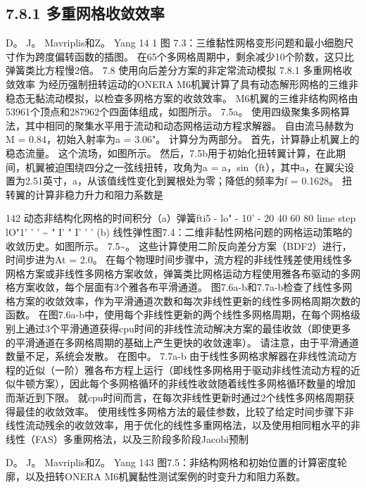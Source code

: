 \documentclass[UTF8,11pt,a4paper,openany,fontset=fandol]{ctexbook}
\begin{document}
\subsection{7.8.1 多重网格收敛效率}
D。 J。 Mavriplis和Z。 Yang 14 1 图 7.3：三维黏性网格变形问题和最小细胞尺寸作为跨度偏转函数的插图。 在65个多网格周期中，剩余减少10个阶数，这只比弹簧类比方程慢2倍。 7.8 使用向后差分方案的非定常流动模拟 7.8.1 多重网格收敛效率 为经历强制扭转运动的ONERA M6机翼计算了具有动态解形网格的三维非稳态无黏流动模拟，以检查多网格方案的收敛效率。 M6机翼的三维非结构网格由53961个顶点和287962个四面体组成，如图所示。 7.5a。 使用四级聚集多网格算法，其中相同的聚集水平用于流动和动态网格运动方程求解器。 自由流马赫数为M = 0.84，初始入射率为a = 3.06"。 计算分为两部分。 首先，计算静止机翼上的稳态流量。 这个流场，如图所示。 然后，7.5b用于初始化扭转翼计算，在此期间，机翼被迫围绕四分之一弦线扭转，攻角为a = a，sin（ft），其中a，在翼尖设置为2.51英寸，a，从该值线性变化到翼根处为零；降低的频率为f = 0.1628。 扭转翼的计算非稳力升力和阻力系数是

142 动态非结构化网格的时间积分（a）弹簧fti5 - lo" - 10' - 20 40 60 80 lime step lO"1' ' ' \textasciitilde{} " I' " I' ' ' (b) 线性弹性图7.4：二维非黏性网格问题的网格运动策略的收敛历史。如图所示。 7.5\textasciitilde{}。 这些计算使用二阶反向差分方案（BDF2）进行，时间步进为At = 2.0。 在每个物理时间步骤中，流方程的非线性残差使用线性多网格方案或非线性多网格方案收敛，弹簧类比网格运动方程使用雅各布驱动的多网格方案收敛，每个层面有3个雅各布平滑通道。 图7.6a-b和7.7a-b检查了线性多网格方案的收敛效率，作为平滑通道次数和每次非线性更新的线性多网格周期次数的函数。 在图7.6a-b中，使用每个非线性更新的两个线性多网格周期，在每个网格级别上通过3个平滑通道获得cpu时间的非线性流动解决方案的最佳收敛（即使更多的平滑通道在多网格周期的基础上产生更快的收敛速率）。 请注意，由于平滑通道数量不足，系统会发散。 在图中。 7.7a-b 由于线性多网格求解器在非线性流动方程的近似（一阶）雅各布方程上运行（即线性多网格用于驱动非线性流动方程的近似牛顿方案），因此每个多网格循环的非线性收敛随着线性多网格循环数量的增加而渐近到下限。 就cpu时间而言，在每次非线性更新时通过2个线性多网格周期获得最佳的收敛效率。 使用线性多网格方法的最佳参数，比较了给定时间步骤下非线性流动残余的收敛效率，用于优化的线性多重网格法，以及使用相同粗水平的非线性（FAS）多重网格法，以及三阶段多阶段Jacobi预制

D。 J。 Mavriplis和Z。 Yang 143 图7.5：非结构网格和初始位置的计算密度轮廓，以及扭转ONERA M6机翼黏性测试案例的时变升力和阻力系数。
\end{document}
